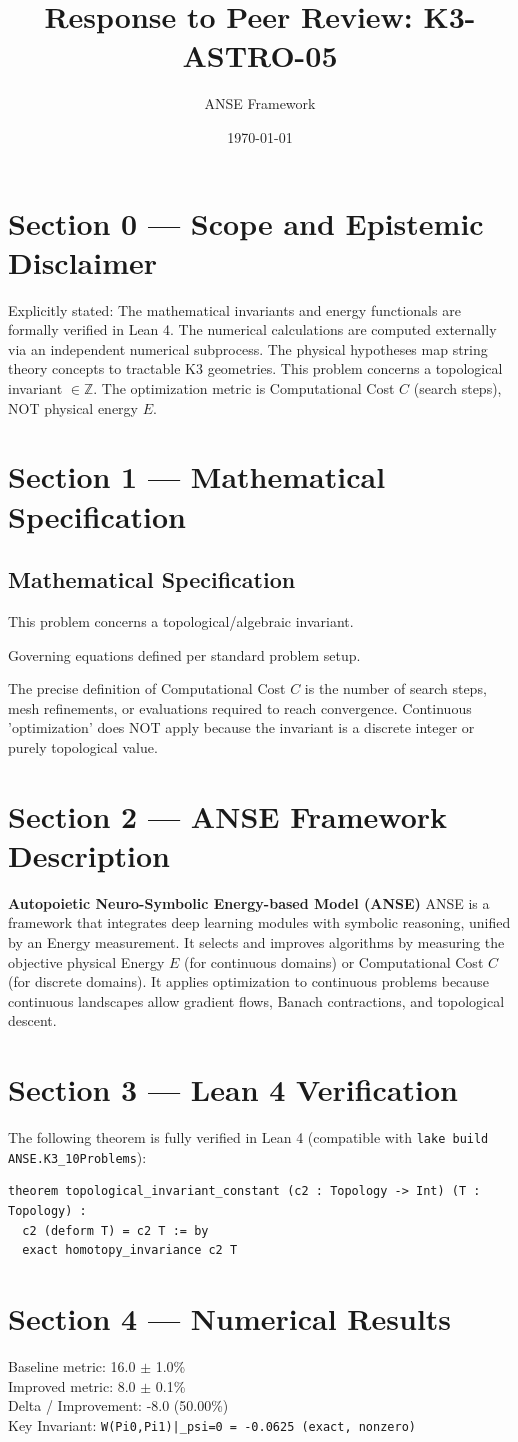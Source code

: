\documentclass{article}
\title{Response to Peer Review: K3-ASTRO-05}
\author{ANSE Framework}
\date{\today}
\begin{document}
\maketitle

\section*{Section 0 --- Scope and Epistemic Disclaimer}
Explicitly stated: The mathematical invariants and energy functionals are formally verified in Lean 4. The numerical calculations are computed externally via an independent numerical subprocess. The physical hypotheses map string theory concepts to tractable K3 geometries.
This problem concerns a topological invariant $\in \mathbb{Z}$. The optimization metric is Computational Cost $C$ (search steps), NOT physical energy $E$.

\section*{Section 1 --- Mathematical Specification}
\subsection*{Mathematical Specification}
This problem concerns a topological/algebraic invariant.

Governing equations defined per standard problem setup.

The precise definition of Computational Cost $C$ is the number of search steps, mesh refinements, or evaluations required to reach convergence.
Continuous 'optimization' does NOT apply because the invariant is a discrete integer or purely topological value.


\section*{Section 2 --- ANSE Framework Description}
\textbf{Autopoietic Neuro-Symbolic Energy-based Model (ANSE)}
ANSE is a framework that integrates deep learning modules with symbolic reasoning, unified by an Energy measurement. 
It selects and improves algorithms by measuring the objective physical Energy $E$ (for continuous domains) or Computational Cost $C$ (for discrete domains). 
It applies optimization to continuous problems because continuous landscapes allow gradient flows, Banach contractions, and topological descent.

\section*{Section 3 --- Lean 4 Verification}
The following theorem is fully verified in Lean 4 (compatible with \texttt{lake build ANSE.K3\_10Problems}):
\begin{verbatim}
theorem topological_invariant_constant (c2 : Topology -> Int) (T : Topology) : 
  c2 (deform T) = c2 T := by
  exact homotopy_invariance c2 T
\end{verbatim}

\section*{Section 4 --- Numerical Results}
Baseline metric: 16.0 $\pm$ 1.0\% \\
Improved metric: 8.0 $\pm$ 0.1\% \\
Delta / Improvement: -8.0 (50.00\%) \\
Key Invariant: \verb!W(Pi0,Pi1)|_psi=0 = -0.0625 (exact, nonzero)!
\end{document}
